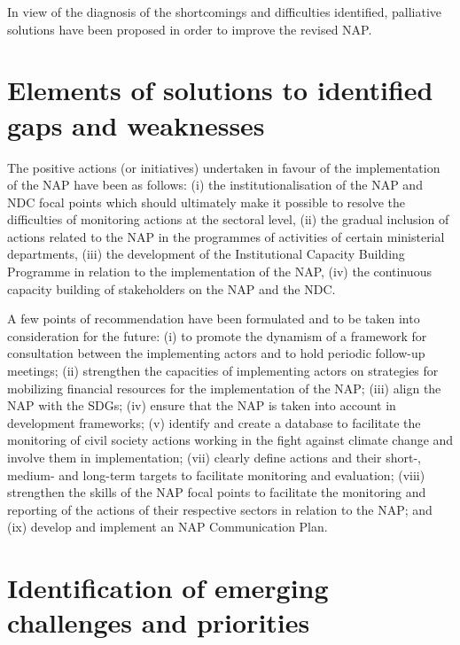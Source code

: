 \documentclass[
]{book}
\begin{document}
In view of the diagnosis of the shortcomings and difficulties identified, palliative solutions have been proposed in order to improve the revised NAP.

\section{Elements of solutions to identified gaps and weaknesses}\label{elements-of-solutions-to-identified-gaps-and-weaknesses}

The positive actions (or initiatives) undertaken in favour of the implementation of the NAP have been as follows: (i) the institutionalisation of the NAP and NDC focal points which should ultimately make it possible to resolve the difficulties of monitoring actions at the sectoral level, (ii) the gradual inclusion of actions related to the NAP in the programmes of activities of certain ministerial departments, (iii) the development of the Institutional Capacity Building Programme in relation to the implementation of the NAP, (iv) the continuous capacity building of stakeholders on the NAP and the NDC.

A few points of recommendation have been formulated and to be taken into consideration for the future: (i) to promote the dynamism of a framework for consultation between the implementing actors and to hold periodic follow-up meetings; (ii) strengthen the capacities of implementing actors on strategies for mobilizing financial resources for the implementation of the NAP; (iii) align the NAP with the SDGs; (iv) ensure that the NAP is taken into account in development frameworks; (v) identify and create a database to facilitate the monitoring of civil society actions working in the fight against climate change and involve them in implementation; (vii) clearly define actions and their short-, medium- and long-term targets to facilitate monitoring and evaluation; (viii) strengthen the skills of the NAP focal points to facilitate the monitoring and reporting of the actions of their respective sectors in relation to the NAP; and (ix) develop and implement an NAP Communication Plan.

\section{Identification of emerging challenges and priorities}\label{identification-of-emerging-challenges-and-priorities}
\end{document}
